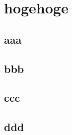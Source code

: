 \documentclass[11pt, dvipdfmx]{jreport}
\begin{document}
\chapter{hogehoge}
\label{chap:hogehoge}

\section{aaa}

\section{bbb}

\section{ccc}

\section{ddd}
\end{document}
